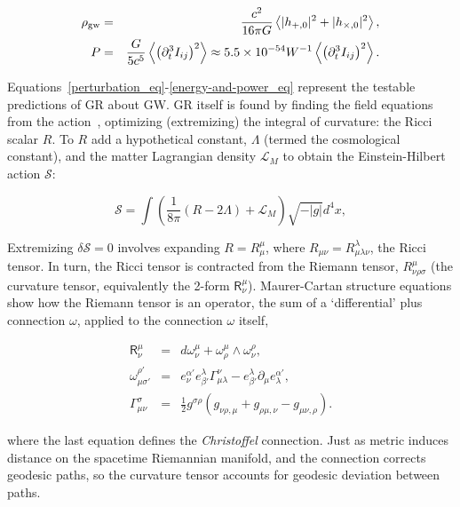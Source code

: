\begin{eqnarray}
\rho_{\textup{gw}} &=& \frac{c^2}{16 \pi G} \left\langle |h_{+,0}|^2 + |h_{\times,0}|^2 \right\rangle,\\
P &=& \frac{G}{5c^5}\left\langle \left( \partial_t^3 I_{ij}\right)^2  \right\rangle \approx 5.5\times 10^{-54} W^{-1} \left\langle \left( \partial_t^3 I_{ij}\right)^2  \right\rangle.
\label{energy-and-power_eq}
\end{eqnarray}

Equations~\ref{perturbation_eq}-\ref{energy-and-power_eq} represent the testable predictions of GR about GW. 
GR itself is found by finding the field equations from the action~\cite{FarrThesis}, optimizing (extremizing) the integral of curvature: the Ricci scalar $R$.
To $R$ add a hypothetical constant, $\Lambda$ (termed the cosmological constant), and the matter Lagrangian density $\mathcal{L}_M$ to obtain the Einstein-Hilbert action $\mathcal{S}$:

\begin{equation}
\mathcal{S} = \int \left( \frac{1}{8\pi}\left(R - 2\Lambda\right) + \mathcal{L}_M \right) \sqrt{-|g|}d^4 x,
\end{equation}

Extremizing $\delta \mathcal{S} = 0$ involves expanding $R = R^\mu_\mu$, where $R_{\mu\nu} = R^\lambda_{\mu\lambda\nu}$, the Ricci tensor. In turn, the Ricci tensor is contracted from the Riemann tensor, $R^\mu_{\nu\rho\sigma}$ (the curvature tensor, equivalently the 2-form $\textsf{R}^\mu_\nu$). Maurer-Cartan structure equations show how the Riemann tensor is an operator, the sum of a `differential' plus connection $\omega$, applied to the connection $\omega$ itself,

\begin{eqnarray}
\textsf{R}^\mu_\nu &=& d\omega^\mu_\nu + \omega^\mu_\rho \wedge \omega^\rho_\nu, \\
\omega^{\rho'}_{\mu\sigma'} &=& e^{\alpha'}_{\nu} e^{\lambda}_{\beta'} \Gamma^{\nu}_{\mu\lambda} - e^{\lambda}_{\beta'} \partial_{\mu} e^{\alpha'}_{\lambda},\\
\Gamma^\sigma_{\mu\nu} &=& \frac{1}{2} g^{\sigma\rho} \left( g_{\nu \rho, \mu} + g_{\rho \mu, \nu} - g_{\mu\nu,\rho} \right). 
\end{eqnarray}

\noindent where the last equation defines the \textit{Christoffel} connection. Just as metric induces distance on the spacetime Riemannian manifold, and the connection corrects geodesic paths, so the curvature tensor accounts for geodesic deviation between paths.

